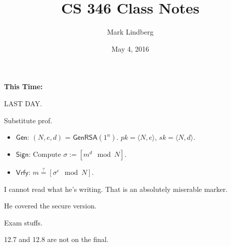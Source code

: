 \documentclass[12pt]{article}
\newcommand{\Sign}{\mathsf{Sign}}
\newcommand{\Vrfy}{\mathsf{Vrfy}}
\newcommand{\Gen}{\mathsf{Gen}}
\newcommand{\GenRSA}{\mathsf{GenRSA}}
\newcommand{\ang}[1]{\langle#1\rangle}
\begin{document}
\title{CS 346 Class Notes}
\date{May 4, 2016}
\author{Mark Lindberg}
\maketitle
\thispagestyle{fancy}

{\bf This Time:}

LAST DAY.

Substitute prof.

\begin{itemize}

\item $\Gen$: $(N,e,d)$ = $\GenRSA(1^n)$. $pk=\ang{N,e}$, $sk=\ang{N,d}$.

\item $\Sign$: Compute $\sigma:=[m^d\mod{N}]$.

\item $\Vrfy$: $m\overset{?}{=}[\sigma^e\mod{N}]$.

\end{itemize}

I cannot read what he's writing. That is an absolutely miserable marker.

He covered the secure version.

Exam stuffs.

12.7 and 12.8 are not on the final.
\end{document}
